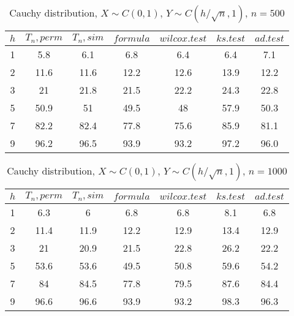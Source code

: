 \documentclass{svproc}
\begin{document}
\begin{table}
  \caption{Cauchy distribution, $X\sim C(0,1)$, $Y\sim C(h/\sqrt{n},1)$, $n=500$}
  \begin{center}
  \begin{tabular}{c@{\quad}c@{\quad}c@{\quad}c@{\quad}c@{\quad}c@{\quad}c}
  \hline
  $h$ & $T_n, perm$ & $T_n, sim$ & $formula$ & $wilcox.test$ & $ks.test$ & $ad.test$ \\
  \hline
  1 & 5.8   & 6.1      & 6.8       & 6.4           & 6.4      & 7.1 \\
  2 & 11.6  & 11.6     & 12.2      & 12.6          & 13.9     & 12.2 \\
  3 & 21    & 21.8     & 21.5      & 22.2          & 24.3     & 22.8 \\
  5 & 50.9  & 51       & 49.5      & 48            & 57.9     & 50.3 \\
  7 & 82.2  & 82.4     & 77.8      & 75.6          & 85.9     & 81.1 \\
  9 & 96.2  & 96.5     & 93.9      & 93.2          & 97.2     & 96.0 \\
  \hline
  \end{tabular}
  \end{center}
\end{table}

\begin{table}
  \caption{Cauchy distribution, $X\sim C(0,1)$, $Y\sim C(h/\sqrt{n},1)$, $n=1000$}
  \begin{center}
  \begin{tabular}{c@{\quad}c@{\quad}c@{\quad}c@{\quad}c@{\quad}c@{\quad}c}
  \hline
  $h$  & $T_n, perm$ & $T_n, sim$ & $formula$ & $wilcox.test$ & $ks.test$ & $ad.test$ \\
  \hline
  1 & 6.3 & 6 & 6.8 & 6.8 & 8.1 & 6.8\\
  2 & 11.4 & 11.9 & 12.2 & 12.9 & 13.4 & 12.9 \\
  3 & 21 & 20.9 & 21.5 & 22.8 & 26.2 & 22.2 \\
  5 & 53.6 & 53.6 & 49.5 & 50.8 & 59.6 & 54.2 \\
  7 & 84 & 84.5 & 77.8 & 79.5 & 87.6 & 84.4 \\
  9 & 96.6 & 96.6 & 93.9 & 93.2 & 98.3 & 96.3 \\
  \hline
  \end{tabular}
  \end{center}
\end{table}
\end{document}
